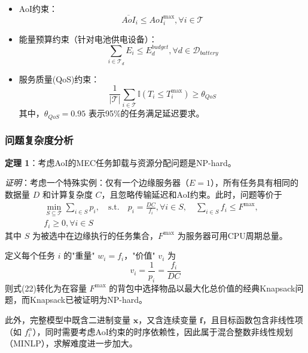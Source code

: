 \documentclass[conference]{IEEEtran}
\begin{document}
\begin{itemize}
    \item AoI约束：
        \begin{equation}
            \overline{AoI}_i \leq AoI_i^{\max}, \forall i \in \mathcal{T}
        \end{equation}
    \item 能量预算约束（针对电池供电设备）：
        \begin{equation}
            \sum_{i \in \mathcal{T}_d} E_i \leq E_{d}^{budget}, \forall d \in \mathcal{D}_{battery}
        \end{equation}
    \item 服务质量(QoS)约束：
        \begin{equation}
            \frac{1}{|\mathcal{T}|} \sum_{i \in \mathcal{T}} \mathbb{I}(T_i \leq T_i^{\max}) \geq \theta_{QoS}
        \end{equation}
        其中，$\theta_{QoS} = 0.95$ 表示95\%的任务满足延迟要求。
\end{itemize}

\subsubsection{问题复杂度分析}
\textbf{定理 1}：考虑AoI的MEC任务卸载与资源分配问题是NP-hard。

\textit{证明}：考虑一个特殊实例：仅有一个边缘服务器（$E = 1$），所有任务具有相同的数据量 $D$ 和计算复杂度 $C$，且忽略传输延迟和AoI约束。此时，问题等价于
\begin{equation}
    \begin{split}
        \min_{S \subseteq \mathcal{T}} \sum_{i \in S} p_i, \quad
        \text{s.t.} \quad p_i = \frac{DC}{f_i}, \forall i \in S, \quad 
        \sum_{i \in S} f_i \leq F^{\max}, \quad \\
        f_i \geq 0, \forall i \in S
    \end{split}
\end{equation}
其中 $S$ 为被选中在边缘执行的任务集合，$F^{\max}$ 为服务器可用CPU周期总量。

定义每个任务 $i$ 的"重量" $w_i = f_i$，"价值" $v_i$ 为
\begin{equation}
v_i = \frac{1}{p_i} = \frac{f_i}{DC}
\end{equation}
则式(22)转化为在容量 $F^{\max}$ 的背包中选择物品以最大化总价值的经典Knapsack问题，而Knapsack已被证明为NP-hard。

此外，完整模型中既含二进制变量 $\mathbf{x}$，又含连续变量 $\mathbf{f}$，且目标函数包含非线性项（如 $f_i^{\alpha}$），同时需要考虑AoI约束的时序依赖性，因此属于混合整数非线性规划（MINLP），求解难度进一步加大。
\end{document}
